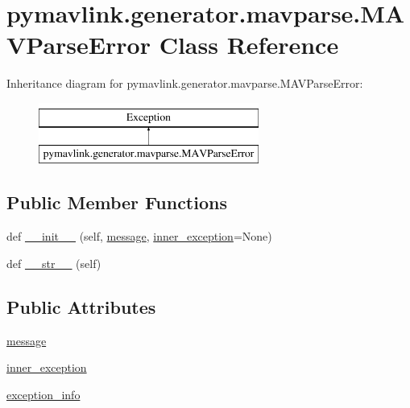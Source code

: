\hypertarget{classpymavlink_1_1generator_1_1mavparse_1_1MAVParseError}{}\section{pymavlink.\+generator.\+mavparse.\+M\+A\+V\+Parse\+Error Class Reference}
\label{classpymavlink_1_1generator_1_1mavparse_1_1MAVParseError}
Inheritance diagram for pymavlink.\+generator.\+mavparse.\+M\+A\+V\+Parse\+Error\+:\begin{figure}[H]
\begin{center}
\leavevmode
\includegraphics[height=2.000000cm]{classpymavlink_1_1generator_1_1mavparse_1_1MAVParseError}
\end{center}
\end{figure}
\subsection*{Public Member Functions}
\begin{DoxyCompactItemize}
\item 
def \mbox{\hyperlink{classpymavlink_1_1generator_1_1mavparse_1_1MAVParseError_aa1e76d16c6c42f278bc0373374c4f90e}{\+\_\+\+\_\+init\+\_\+\+\_\+}} (self, \mbox{\hyperlink{classpymavlink_1_1generator_1_1mavparse_1_1MAVParseError_ac5a23274e71dc24aebf5413e980a6eb0}{message}}, \mbox{\hyperlink{classpymavlink_1_1generator_1_1mavparse_1_1MAVParseError_acfcccef17615294c4f1a48b9dbcb2e33}{inner\+\_\+exception}}=None)
\item 
def \mbox{\hyperlink{classpymavlink_1_1generator_1_1mavparse_1_1MAVParseError_a92f1e0272ecee341be18ab9abc3e46e0}{\+\_\+\+\_\+str\+\_\+\+\_\+}} (self)
\end{DoxyCompactItemize}
\subsection*{Public Attributes}
\begin{DoxyCompactItemize}
\item 
\mbox{\hyperlink{classpymavlink_1_1generator_1_1mavparse_1_1MAVParseError_ac5a23274e71dc24aebf5413e980a6eb0}{message}}
\item 
\mbox{\hyperlink{classpymavlink_1_1generator_1_1mavparse_1_1MAVParseError_acfcccef17615294c4f1a48b9dbcb2e33}{inner\+\_\+exception}}
\item 
\mbox{\hyperlink{classpymavlink_1_1generator_1_1mavparse_1_1MAVParseError_a6a6d8da831e20b764aa2b383489f561d}{exception\+\_\+info}}
\end{DoxyCompactItemize}


